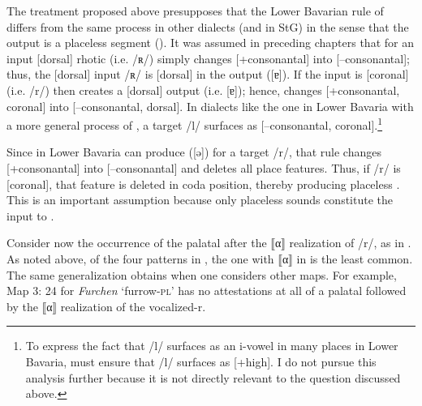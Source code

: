 The treatment proposed above presupposes that the Lower Bavarian rule of  differs from the same process in other dialects (and in StG) in the sense that the output is a placeless segment (). It was assumed in preceding chapters that  for an input [dorsal] rhotic (i.e. /ʀ/) simply changes [+consonantal] into [--consonantal]; thus, the [dorsal] input /ʀ/ is [dorsal] in the output ([ɐ]). If the input is [coronal] (i.e. /r/) then  creates a [dorsal] output (i.e. [ɐ]); hence,  changes [+consonantal, coronal] into [--consonantal, dorsal]. In dialects like the one in Lower Bavaria with a more general process of , a target /l/ surfaces as [--consonantal, coronal].\footnote{{To express the fact that /l/ surfaces as an i-vowel in many places in Lower Bavaria,  must ensure that /l/ surfaces as [+high]. I do not pursue this analysis further because it is not directly relevant to the question discussed above.}}

Since  in Lower Bavaria can produce  ([ə]) for a target /r/, that rule changes [+consonantal] into [--consonantal] and deletes all place features. Thus, if /r/ is [coronal], that feature is deleted in coda position, thereby producing placeless . This is an important assumption because only placeless sounds constitute the input to .

Consider now the occurrence of the palatal after the ⟦α⟧ realization of /r/, as in . As noted above, of the four patterns in , the one with ⟦α⟧ in  is the least common. The same generalization obtains when one considers other maps. For example, Map 3: 24 for \textit{Furchen} ‘furrow-\textsc{pl}’ has no attestations at all of a palatal followed by the ⟦α⟧ realization of the vocalized-r.


